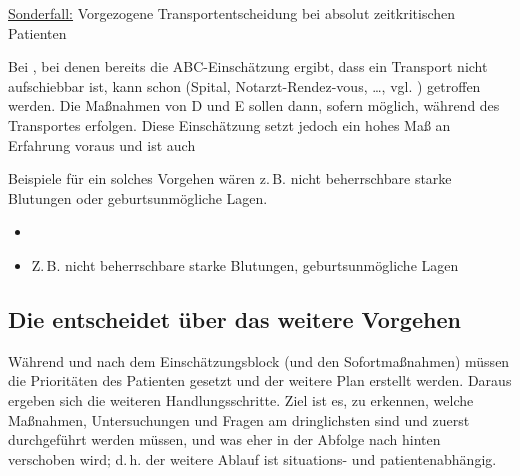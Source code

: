 



\TextSlide
{\underline{Sonderfall:} Vorgezogene Transportentscheidung bei absolut zeitkritischen Patienten}
{%
\label{topic:sonderfall-absolut-zeitkritische-patienten-apam}
Bei , bei denen bereits
die ABC-Einschätzung ergibt, dass ein Transport nicht
aufschiebbar ist, kann schon  (Spital,
Notarzt-Rendez-vous, \ldots, vgl.
) getroffen werden.
Die Maßnahmen von D und E sollen dann, sofern möglich,
während des Transportes erfolgen.
Diese Einschätzung setzt jedoch ein hohes Maß an Erfahrung
voraus und ist auch


Beispiele für ein solches Vorgehen wären z.\,B. nicht
beherrschbare starke Blutungen oder geburtsunmögliche Lagen.
}
{
\begin{itemize}
  \item {}
  \item Z.\,B. nicht beherrschbare starke 
  Blutungen, geburtsunmögliche Lagen
\end{itemize}
}
{}
{}
{}





\subsection{Die  entscheidet über das weitere Vorgehen}

\label{topic:pam-strategie-apam}
\label{topic:strategieentscheidung-apam}

Während und nach dem Einschätzungsblock (und den Sofortmaßnahmen) müssen
die Prioritäten des Patienten gesetzt und der weitere
Plan erstellt werden. Daraus ergeben sich die weiteren
Handlungsschritte. Ziel ist es, zu erkennen, welche
Maßnahmen, Untersuchungen und Fragen am dringlichsten sind
und zuerst durchgeführt werden müssen, und was eher in der
Abfolge nach hinten ver\-schoben wird; d.\,h. der weitere
Ablauf ist situations- und patientenabhängig.

